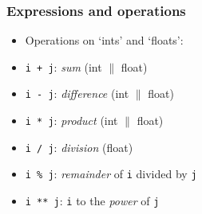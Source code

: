 \documentclass[notes]{beamer}
\begin{document}
\begin{frame}[fragile]
	\frametitle{Expressions and operations}
	\begin{itemize}	
		\item Operations on `ints' and `floats':
		\item \verb|i + j|: \textit{sum} (int $\|$ float)
		\item \verb|i - j|: \textit{difference} (int $\|$ float)	
		\item \verb|i * j|: \textit{product} (int $\|$ float)
		\item \verb|i / j|: \textit{division} (float)
		\item \verb|i % j|: \textit{remainder} of \verb|i| divided by \verb|j|
		\item \verb|i ** j|: \verb|i| to the \textit{power} of \verb|j|
	\end{itemize}
\end{frame}
\end{document}
